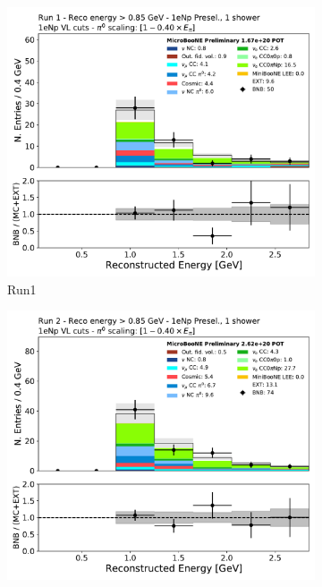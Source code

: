 \begin{figure}[H]
    \begin{center}
    \begin{subfigure}{0.32\textwidth}
    \includegraphics[width=1.00\textwidth]{Sidebands/Figures/1eNp/TimeDependence/reco_e_coarse_HE_NPVL_Run1.pdf}
    \caption{Run1}
    \end{subfigure}
    \begin{subfigure}{0.32\textwidth}
    \includegraphics[width=1.00\textwidth]{Sidebands/Figures/1eNp/TimeDependence/reco_e_coarse_HE_NPVL_Run2.pdf}

\end{subfigure}
\end{center}
\end{figure}
